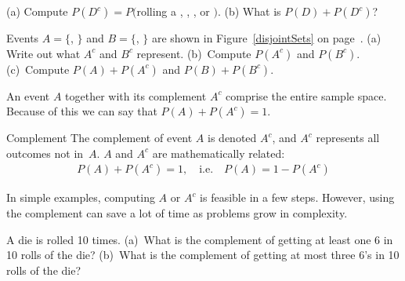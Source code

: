 \begin{exercisewrap}
\begin{nexercise}
(a) Compute $P(D^c) = P($rolling a , , , or $)$. (b) What is $P(D) + P(D^c)$?\footnotemark
\end{nexercise}
\end{exercisewrap}

\D{\newpage}

\begin{exercisewrap}
\begin{nexercise}
Events $A=\{$, $\}$ and $B=\{$, $\}$ are shown in Figure~\ref{disjointSets} on page~\pageref{disjointSets}. (a) Write out what $A^c$ and $B^c$ represent. (b)~Compute $P(A^c)$ and $P(B^c)$. (c)~Compute $P(A)+P(A^c)$ and $P(B)+P(B^c)$.\footnotemark\end{nexercise}
\end{exercisewrap}


An event $A$ together with its complement $A^c$ comprise the entire sample space. Because of this we can say that $P(A) + P(A^c) = 1$.

\begin{onebox}{Complement}
The complement of event $A$ is denoted $A^c$, and $A^c$ represents all outcomes not in~$A$. $A$ and $A^c$ are mathematically related: \vspace{-2mm}
\begin{eqnarray*}\label{complement}
P(A) + P(A^c) = 1, \quad\text{i.e.}\quad P(A) = 1-P(A^c)
\end{eqnarray*}\vspace{-6.5mm}\end{onebox}

In simple examples, computing $A$ or $A^c$ is feasible in a few steps. However, using the complement can save a lot of time as problems grow in complexity.

\begin{exercisewrap}
\begin{nexercise}
A die is rolled 10 times. (a)~What is the complement of getting at least one 6 in 10 rolls of the die? (b)~What is the complement of getting at most three 6's in 10 rolls of the die?\footnotemark
\end{nexercise}
\end{exercisewrap}


